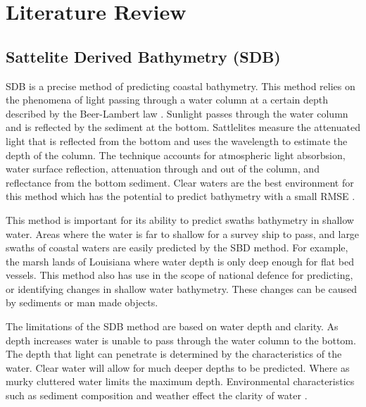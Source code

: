 \section{Literature Review}
\setlength{\parindent}{10ex}



\subsection{Sattelite Derived Bathymetry (SDB)}
\ac{SDB} is a precise method of predicting coastal bathymetry. 
This method relies on the phenomena of light passing through a water column at a certain depth described by the Beer-Lambert law \cite{chybicki2018three}\cite{vinayaraj2016satellite}.
Sunlight passes through the water column and is reflected by the sediment at the bottom.
Sattlelites measure the attenuated light that is reflected from the bottom and uses the wavelength to estimate the depth of the column.
The technique accounts for atmospheric light absorbsion, water surface reflection, attenuation through and out of the column, and reflectance from the bottom sediment.
Clear waters are the best environment for this method which has the potential to predict bathymetry with a small RMSE \cite{chybicki2018three}.

\par
This method is important for its ability to predict swaths bathymetry in shallow water.
Areas where the water is far to shallow for a survey ship to pass, and large swaths of coastal waters are easily predicted by the \ac{SBD} method.
For example, the marsh lands of Louisiana where water depth is only deep enough for flat bed vessels.
This method also has use in the scope of national defence for predicting, or identifying changes in shallow water bathymetry.
These changes can be caused by sediments or man made objects. 

\par
The limitations of the \ac{SDB} method are based on water depth and clarity.
As depth increases water is unable to pass through the water column to the bottom.
The depth that light can penetrate is determined by the characteristics of the water.
Clear water will allow for much deeper depths to be predicted.
Where as murky cluttered water limits the maximum depth.
Environmental characteristics such as sediment composition and weather effect the clarity of water \cite{vinayaraj2016satellite}.

